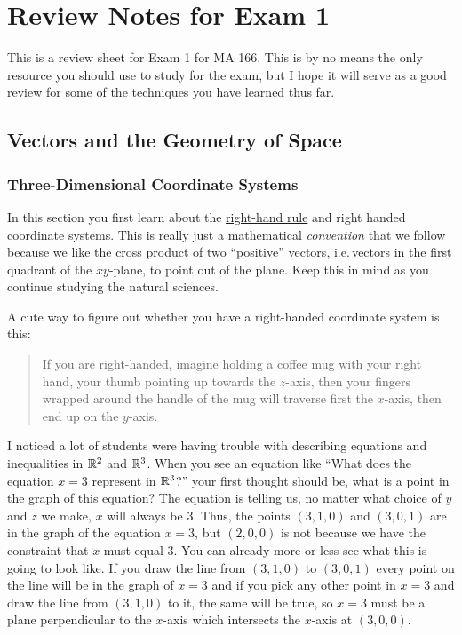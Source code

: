 \chapter{Review Notes for Exam 1}
This is a review sheet for Exam 1 for MA 166. This is by no means the only
resource you should use to study for the exam, but I hope it will serve as
a good review for some of the techniques you have learned thus far.
\section{Vectors and the Geometry of Space}
\subsection{Three-Dimensional Coordinate Systems}
In this section you first learn about the
\href{https://en.wikipedia.org/wiki/Right-hand_rule}{right-hand rule} and
right handed coordinate systems. This is really just a mathematical
\emph{convention} that we follow because we like the cross product of two
``positive'' vectors, i.e.\,vectors in the first quadrant of the
$xy$-plane, to point out of the plane. Keep this in mind as you continue
studying the natural sciences.

A cute way to figure out whether you have a right-handed coordinate system
is this:
\begin{quote}
If you are right-handed, imagine holding a coffee mug with your
right hand, your thumb pointing up towards the $z$-axis, then your fingers
wrapped around the handle of the mug will traverse first the $x$-axis, then
end up on the $y$-axis.
\end{quote}
I noticed a lot of students were having trouble with describing equations
and inequalities in $\mathbb{R}^2$ and $\mathbb{R}^3$. When you see an equation like
``What does the equation $x=3$ represent in $\mathbb{R}^3$?'' your first thought
should be, what is a point in the graph of this equation? The equation is
telling us, no matter what choice of $y$ and $z$ we make, $x$ will always
be $3$. Thus, the points $(3,1,0)$ and $(3,0,1)$ are in the graph of the
equation $x=3$, but $(2,0,0)$ is not because we have the constraint that
$x$ must equal $3$. You can already more or less see what this is going to
look like. If you draw the line from $(3,1,0)$ to $(3,0,1)$ every point on
the line will be in the graph of $x=3$ and if you pick any other point in
$x=3$ and draw the line from $(3,1,0)$ to it, the same will be true, so
$x=3$ must be a plane perpendicular to the $x$-axis which intersects the
$x$-axis at $(3,0,0)$.

